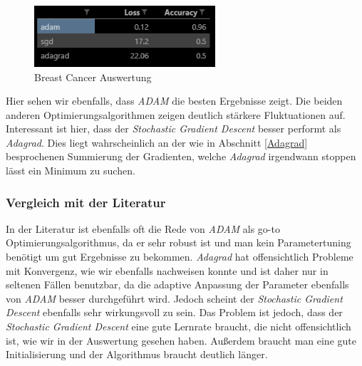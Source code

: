 \begin{figure}[htbp] 
    \centering
       \includegraphics[width=0.6\textwidth]{abb/breast_cancer_score.PNG}
    \caption{Breast Cancer Auswertung}
    \label{fig:BCAuswertung}
\end{figure}

Hier sehen wir ebenfalls, dass \textit{ADAM} die besten Ergebnisse zeigt. 
Die beiden anderen Optimierungsalgorithmen zeigen deutlich stärkere Fluktuationen auf.
Interessant ist hier, dass der \textit{Stochastic Gradient Descent} besser performt als \textit{Adagrad}.
Dies liegt wahrscheinlich an der wie in Abschnitt \ref{Adagrad} besprochenen Summierung der Gradienten,
welche \textit{Adagrad} irgendwann stoppen lässt ein Minimum zu suchen.


\subsubsection{Vergleich mit der Literatur} \label{Vergleich mit Literatur}

In der Literatur ist ebenfalls oft die Rede von \textit{ADAM} als go-to Optimierungsalgorithmus,
da er sehr robust ist und man kein Parametertuning benötigt um gut Ergebnisse zu bekommen. 
\textit{Adagrad} hat offensichtlich Probleme mit Konvergenz, wie wir ebenfalls nachweisen konnte und ist 
daher nur in seltenen Fällen benutzbar, da die adaptive Anpassung der Parameter ebenfalls 
von \textit{ADAM} besser durchgeführt wird. Jedoch scheint der \textit{Stochastic Gradient Descent}
ebenfalls sehr wirkungsvoll zu sein. Das Problem ist jedoch, dass der \textit{Stochastic Gradient Descent}
eine gute Lernrate braucht, die nicht offensichtlich ist, wie wir in der Auswertung gesehen haben.
Außerdem braucht man eine gute Initialisierung und der Algorithmus braucht deutlich länger.
\cite[Abschnitt 4.10]{Ruder.9152016}
